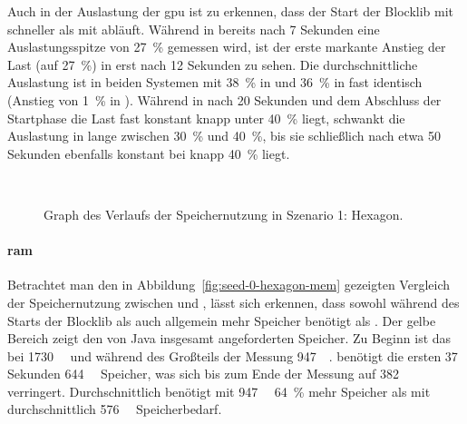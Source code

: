 Auch in der Auslastung der \ac{gpu} ist zu erkennen, dass der Start der Blocklib mit \sysA{} schneller als mit \sysB{} abläuft. Während in \sysA{} bereits nach 7 Sekunden eine Auslastungsspitze von \SI{27}{\percent} gemessen wird, ist der erste markante Anstieg der Last (auf \SI{27}{\percent}) in \sysB{}  erst nach 12 Sekunden zu sehen. Die durchschnittliche Auslastung ist in beiden Systemen mit \SI{38}{\percent} in \sysA{} und \SI{36}{\percent} in \sysB{} fast identisch (Anstieg von \SI{1}{\percent} in \sysB{}). Während in \sysB{} nach 20 Sekunden und dem Abschluss der Startphase die Last fast konstant knapp unter \SI{40}{\percent} liegt, schwankt die Auslastung in \sysA{} lange zwischen \SI{30}{\percent} und \SI{40}{\percent}, bis sie schließlich nach etwa 50 Sekunden ebenfalls konstant bei knapp \SI{40}{\percent} liegt.

\begin{figure}[!htbp]
	\\
	\caption{Graph des Verlaufs der Speichernutzung in Szenario 1: Hexagon.}\label{fig:seed-0-hexagon-mem}
\end{figure} 
\paragraph{\ac{ram}} Betrachtet man den in Abbildung~\vref{fig:seed-0-hexagon-mem} gezeigten Vergleich der Speichernutzung zwischen \sysA{} und \sysB{}, lässt sich erkennen, dass \sysB{} sowohl während des Starts der Blocklib als auch allgemein mehr Speicher benötigt als \sysA{}. Der gelbe Bereich zeigt den von Java insgesamt angeforderten Speicher. Zu Beginn ist das bei \sysB{} \SI{1730}{\mega\byte} und während des Großteils der Messung \SI{947}{\mega\byte}. \sysA{} benötigt die ersten 37 Sekunden \SI{644}{\mega\byte} Speicher, was sich bis zum Ende der Messung auf \SI{382}{\mega\byte} verringert. Durchschnittlich benötigt \sysB{} mit \SI{947}{\mega\byte} \SI{64}{\percent} mehr Speicher als \sysA{} mit durchschnittlich \SI{576}{\mega\byte} Speicherbedarf.

